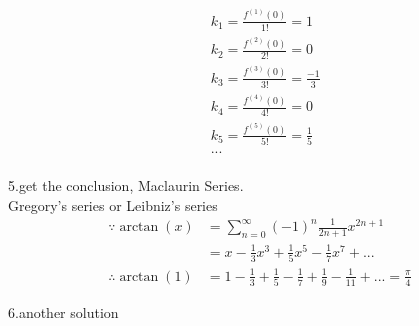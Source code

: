 \documentclass[11pt,a4paper]{article}
\begin{document}
\begin{align*}
       & k_{1} = \frac{ f ^{\left( 1 \right)}\left( 0 \right) } { 1! } = 1  \\
       & k_{2} = \frac{ f ^{\left( 2 \right)}\left( 0 \right) } { 2! } = 0  \\
       & k_{3} = \frac{ f ^{\left( 3 \right)}\left( 0 \right) } { 3! } = \frac {-1}{3}  \\
       & k_{4} = \frac{ f ^{\left( 4 \right)}\left( 0 \right) } { 4! } = 0  \\
       & k_{5} = \frac{ f ^{\left( 5 \right)}\left( 0 \right) } { 5! } = \frac {1}{5}  \\
       &...\\
\end{align*}

5.get the conclusion, Maclaurin Series.
\\ Gregory's series or Leibniz's series
\begin{align*}
    \because \arctan \left( x \right)  &= \sum \limits_{n=0}^{\infty} (-1)^{n} { \frac{1}{2n+1} } x^{2n+1}   \\
                              &= x - \frac{1}{3}x^{3} +  \frac{1}{5}x^{5} -  \frac{1}{7}x^{7} + ...\\  
    \therefore \arctan \left( 1 \right)  &= 1-\frac{1}{3} +  \frac{1}{5} -  \frac{1}{7} + \frac{1}{9} -\frac{1}{11}+... =\frac{ \pi }{4}
\end{align*}

6.another solution \\
\end{document}
